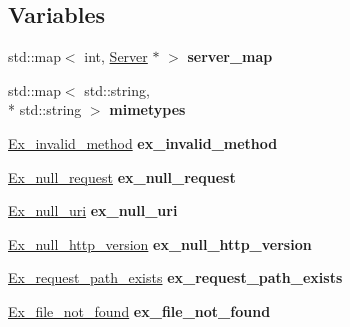 \subsection*{Variables}
\begin{DoxyCompactItemize}
\item 
\hypertarget{namespaceswift_a0d54eeac3847161ee8afa83619ab7cc2}{std\-::map$<$ int, \hyperlink{classswift_1_1_server}{Server} $\ast$ $>$ {\bfseries server\-\_\-map}}\label{namespaceswift_a0d54eeac3847161ee8afa83619ab7cc2}

\item 
\hypertarget{namespaceswift_a03e7a101170e687662cdf778e9f20117}{std\-::map$<$ std\-::string, \\*
std\-::string $>$ {\bfseries mimetypes}}\label{namespaceswift_a03e7a101170e687662cdf778e9f20117}

\item 
\hypertarget{namespaceswift_a89b7510a7218be3e43722a4ee4bc4120}{\hyperlink{classswift_1_1_ex__invalid__method}{Ex\-\_\-invalid\-\_\-method} {\bfseries ex\-\_\-invalid\-\_\-method}}\label{namespaceswift_a89b7510a7218be3e43722a4ee4bc4120}

\item 
\hypertarget{namespaceswift_af95af3029fc8a043ef49e7458c022336}{\hyperlink{classswift_1_1_ex__null__request}{Ex\-\_\-null\-\_\-request} {\bfseries ex\-\_\-null\-\_\-request}}\label{namespaceswift_af95af3029fc8a043ef49e7458c022336}

\item 
\hypertarget{namespaceswift_ae2520bdcfc5988bb8ea0aad5f811ee2a}{\hyperlink{classswift_1_1_ex__null__uri}{Ex\-\_\-null\-\_\-uri} {\bfseries ex\-\_\-null\-\_\-uri}}\label{namespaceswift_ae2520bdcfc5988bb8ea0aad5f811ee2a}

\item 
\hypertarget{namespaceswift_a19796fbd413acda811767422cb144b2e}{\hyperlink{classswift_1_1_ex__null__http__version}{Ex\-\_\-null\-\_\-http\-\_\-version} {\bfseries ex\-\_\-null\-\_\-http\-\_\-version}}\label{namespaceswift_a19796fbd413acda811767422cb144b2e}

\item 
\hypertarget{namespaceswift_aaccf9ded9b03fd9e09f847e2ec16a049}{\hyperlink{classswift_1_1_ex__request__path__exists}{Ex\-\_\-request\-\_\-path\-\_\-exists} {\bfseries ex\-\_\-request\-\_\-path\-\_\-exists}}\label{namespaceswift_aaccf9ded9b03fd9e09f847e2ec16a049}

\item 
\hypertarget{namespaceswift_a5e23430771871a25aa825ee3ec057559}{\hyperlink{classswift_1_1_ex__file__not__found}{Ex\-\_\-file\-\_\-not\-\_\-found} {\bfseries ex\-\_\-file\-\_\-not\-\_\-found}}\label{namespaceswift_a5e23430771871a25aa825ee3ec057559}


\end{DoxyCompactItemize}
